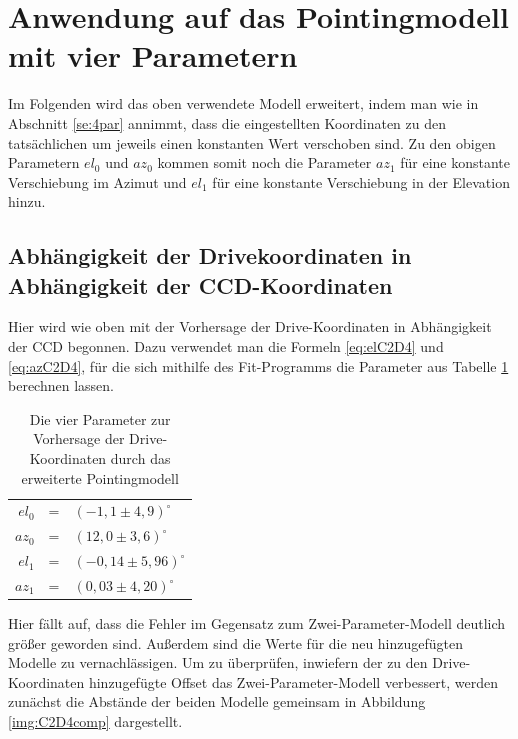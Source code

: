 \section{Anwendung auf das Pointingmodell mit vier Parametern}
Im Folgenden wird das oben verwendete Modell erweitert, indem man wie in Abschnitt \ref{se:4par} annimmt, dass die eingestellten Koordinaten zu den tatsächlichen um jeweils einen konstanten Wert verschoben sind. Zu den obigen Parametern $el_0$ und $az_0$ kommen somit noch die Parameter $az_1$ für eine konstante Verschiebung im Azimut und $el_1$ für eine konstante Verschiebung in der Elevation hinzu.
\subsection{Abhängigkeit der Drivekoordinaten in Abhängigkeit der CCD-Koordinaten}
Hier wird wie oben mit der Vorhersage der Drive-Koordinaten in Abhängigkeit der CCD begonnen. Dazu verwendet man die Formeln \ref{eq:elC2D4} und \ref{eq:azC2D4}, für die sich mithilfe des Fit-Programms die Parameter aus Tabelle \ref{tab:C2D4} berechnen lassen.
\begin{table}[htbp]
\centering
\begin{tabular}{rcl}
\toprule
$el_0$ &=& $(-1,1\pm 4,9)^{\circ}$\\
$az_0$ &=& $(12,0\pm 3,6)^{\circ}$\\
$el_1$ &=& $(-0,14\pm 5,96)^{\circ}$\\
$az_1$ &=& $(0,03\pm 4,20)^{\circ}$\\
\bottomrule
\end{tabular}
\caption{Die vier Parameter zur Vorhersage der Drive-Koordinaten durch das erweiterte Pointingmodell}
\label{tab:C2D4}
\end{table}
Hier fällt auf, dass die Fehler im Gegensatz zum Zwei-Parameter-Modell deutlich größer geworden sind. Außerdem sind die Werte für die neu hinzugefügten Modelle zu vernachlässigen. Um zu überprüfen, inwiefern der zu den Drive-Koordinaten hinzugefügte Offset das Zwei-Parameter-Modell verbessert, werden zunächst die Abstände der beiden Modelle gemeinsam in Abbildung \ref{img:C2D4comp} dargestellt.
